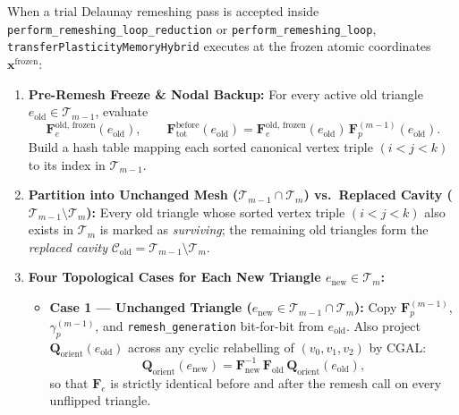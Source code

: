 \documentclass[11pt,a4paper]{article}
\newcommand{\code}[1]{\texttt{#1}}
\begin{document}
When a trial Delaunay remeshing pass is accepted inside \code{perform\_remeshing\_loop\_reduction} or \code{perform\_remeshing\_loop}, \code{transferPlasticityMemoryHybrid} executes at the frozen atomic coordinates $\mathbf{x}^{\text{frozen}}$:

\begin{enumerate}[leftmargin=2em]
  \item \textbf{Pre-Remesh Freeze \& Nodal Backup:}
    For every active old triangle $e_{\text{old}} \in \mathcal{T}_{m-1}$, evaluate
    \begin{equation}
      \mathbf{F}_e^{\text{old, frozen}}(e_{\text{old}}), \qquad
      \mathbf{F}_{\text{tot}}^{\text{before}}(e_{\text{old}}) = \mathbf{F}_e^{\text{old, frozen}}(e_{\text{old}}) \, \mathbf{F}_p^{(m-1)}(e_{\text{old}}).
    \end{equation}
    Build a hash table mapping each sorted canonical vertex triple $(i < j < k)$ to its index in $\mathcal{T}_{m-1}$.

  \item \textbf{Partition into Unchanged Mesh ($\mathcal{T}_{m-1} \cap \mathcal{T}_m$) vs.\ Replaced Cavity ($\mathcal{T}_{m-1} \setminus \mathcal{T}_m$):}
    Every old triangle whose sorted vertex triple $(i < j < k)$ also exists in $\mathcal{T}_m$ is marked as \emph{surviving}; the remaining old triangles form the \emph{replaced cavity} $\mathcal{C}_{\text{old}} = \mathcal{T}_{m-1} \setminus \mathcal{T}_m$.

  \item \textbf{Four Topological Cases for Each New Triangle $e_{\text{new}} \in \mathcal{T}_m$:}
    \begin{itemize}[nosep]
      \item \textbf{Case 1 — Unchanged Triangle ($e_{\text{new}} \in \mathcal{T}_{m-1} \cap \mathcal{T}_m$):}
        Copy $\mathbf{F}_p^{(m-1)}$, $\gamma_p^{(m-1)}$, and \code{remesh\_generation} bit-for-bit from $e_{\text{old}}$. Also project $\mathbf{Q}_{\text{orient}}(e_{\text{old}})$ across any cyclic relabelling of $(v_0,v_1,v_2)$ by CGAL:
        \begin{equation}
          \mathbf{Q}_{\text{orient}}(e_{\text{new}}) = \mathbf{F}_{\text{new}}^{-1}\,\mathbf{F}_{\text{old}}\,\mathbf{Q}_{\text{orient}}(e_{\text{old}}),
        \end{equation}
        so that $\mathbf{F}_e$ is strictly identical before and after the remesh call on every unflipped triangle.


\end{itemize}
\end{enumerate}
\end{document}
